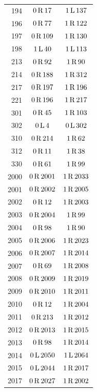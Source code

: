 \begin{longtable}{@{}rcc@{}}
194 & $0\,\mathrm{R}\,17$ & $1\,\mathrm{L}\,137$\\
196 & $0\,\mathrm{R}\,77$ & $1\,\mathrm{R}\,122$\\
197 & $0\,\mathrm{R}\,109$ & $1\,\mathrm{R}\,130$\\
198 & $1\,\mathrm{L}\,40$ & $1\,\mathrm{L}\,113$\\
213 & $0\,\mathrm{R}\,92$ & $1\,\mathrm{R}\,90$\\
214 & $0\,\mathrm{R}\,188$ & $1\,\mathrm{R}\,312$\\
217 & $0\,\mathrm{R}\,197$ & $1\,\mathrm{R}\,196$\\
221 & $0\,\mathrm{R}\,196$ & $1\,\mathrm{R}\,217$\\
301 & $0\,\mathrm{R}\,45$ & $1\,\mathrm{R}\,103$\\
302 & $0\,\mathrm{L}\,4$ & $0\,\mathrm{L}\,302$\\
310 & $0\,\mathrm{R}\,214$ & $1\,\mathrm{R}\,62$\\
312 & $0\,\mathrm{R}\,11$ & $1\,\mathrm{R}\,38$\\
330 & $0\,\mathrm{R}\,61$ & $1\,\mathrm{R}\,99$\\
2000 & $0\,\mathrm{R}\,2001$ & $1\,\mathrm{R}\,2033$\\
2001 & $0\,\mathrm{R}\,2002$ & $1\,\mathrm{R}\,2005$\\
2002 & $0\,\mathrm{R}\,12$ & $1\,\mathrm{R}\,2003$\\
2003 & $0\,\mathrm{R}\,2004$ & $1\,\mathrm{R}\,99$\\
2004 & $0\,\mathrm{R}\,98$ & $1\,\mathrm{R}\,90$\\
2005 & $0\,\mathrm{R}\,2006$ & $1\,\mathrm{R}\,2023$\\
2006 & $0\,\mathrm{R}\,2007$ & $1\,\mathrm{R}\,2014$\\
2007 & $0\,\mathrm{R}\,69$ & $1\,\mathrm{R}\,2008$\\
2008 & $0\,\mathrm{R}\,2009$ & $1\,\mathrm{R}\,2019$\\
2009 & $0\,\mathrm{R}\,2010$ & $1\,\mathrm{R}\,2011$\\
2010 & $0\,\mathrm{R}\,12$ & $1\,\mathrm{R}\,2004$\\
2011 & $0\,\mathrm{R}\,213$ & $1\,\mathrm{R}\,2012$\\
2012 & $0\,\mathrm{R}\,2013$ & $1\,\mathrm{R}\,2015$\\
2013 & $0\,\mathrm{R}\,98$ & $1\,\mathrm{R}\,2014$\\
2014 & $0\,\mathrm{L}\,2050$ & $1\,\mathrm{L}\,2064$\\
2015 & $0\,\mathrm{L}\,2044$ & $1\,\mathrm{R}\,2017$\\
2017 & $0\,\mathrm{R}\,2027$ & $1\,\mathrm{R}\,2002$\\

\end{longtable}
